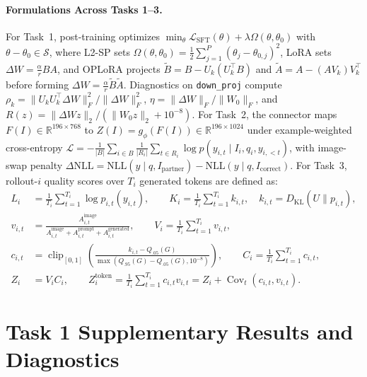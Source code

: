 \documentclass{article}
\begin{document}
\paragraph{Formulations Across Tasks 1--3.}
For Task~1, post-training optimizes $\min_\theta \mathcal{L}_{\text{SFT}}(\theta) + \lambda\Omega(\theta,\theta_0)$ with $\theta - \theta_0 \in \mathcal{S}$, where L2-SP sets $\Omega(\theta,\theta_0) = \frac{1}{2}\sum_{j=1}^P (\theta_j - \theta_{0,j})^2$, LoRA sets $\Delta W = \frac{\alpha}{r}BA$, and OPLoRA projects $\tilde{B} = B - U_k(U_k^\top B)$ and $\tilde{A} = A - (A V_k)V_k^\top$ before forming $\Delta W = \frac{\alpha}{r}\tilde{B}\tilde{A}$. Diagnostics on \texttt{down\_proj} compute $\rho_k = \|U_k U_k^\top \Delta W\|_F^2 / \|\Delta W\|_F^2$, $\eta = \|\Delta W\|_F / \|W_0\|_F$, and $R(z) = \|\Delta W z\|_2 / (\|W_0 z\|_2 + 10^{-8})$. For Task~2, the connector maps $F(I) \in \mathbb{R}^{196 \times 768}$ to $Z(I) = g_\phi(F(I)) \in \mathbb{R}^{196 \times 1024}$ under example-weighted cross-entropy $\mathcal{L} = -\frac{1}{|B|}\sum_{i \in B}\frac{1}{|R_i|}\sum_{t \in R_i} \log p(y_{i,t} \mid I_i, q_i, y_{i,<t})$, with image-swap penalty $\Delta\text{NLL} = \text{NLL}(y \mid q, I_{\text{partner}}) - \text{NLL}(y \mid q, I_{\text{correct}})$. For Task~3, rollout-$i$ quality scores over $T_i$ generated tokens are defined as:
\begin{align}
L_i &= \frac{1}{T_i}\sum_{t=1}^{T_i} \log p_{i,t}(y_{i,t}), \qquad
K_i = \frac{1}{T_i}\sum_{t=1}^{T_i} k_{i,t}, \quad k_{i,t} = D_{\text{KL}}(U \parallel p_{i,t}), \\
v_{i,t} &= \frac{A_{i,t}^{\text{image}}}{A_{i,t}^{\text{image}} + A_{i,t}^{\text{prompt}} + A_{i,t}^{\text{generated}}}, \qquad V_i = \frac{1}{T_i}\sum_{t=1}^{T_i} v_{i,t}, \\
c_{i,t} &= \operatorname{clip}_{[0,1]}\!\left(\frac{k_{i,t} - Q_{.05}(G)}{\max(Q_{.95}(G) - Q_{.05}(G), 10^{-8})}\right), \qquad C_i = \frac{1}{T_i}\sum_{t=1}^{T_i} c_{i,t}, \\
Z_i &= V_i C_i, \qquad Z_i^{\text{token}} = \frac{1}{T_i}\sum_{t=1}^{T_i} c_{i,t} v_{i,t} = Z_i + \operatorname{Cov}_t(c_{i,t}, v_{i,t}).
\end{align}

\section{Task 1 Supplementary Results and Diagnostics}
\label{sec:app_t1_supp}
\end{document}

